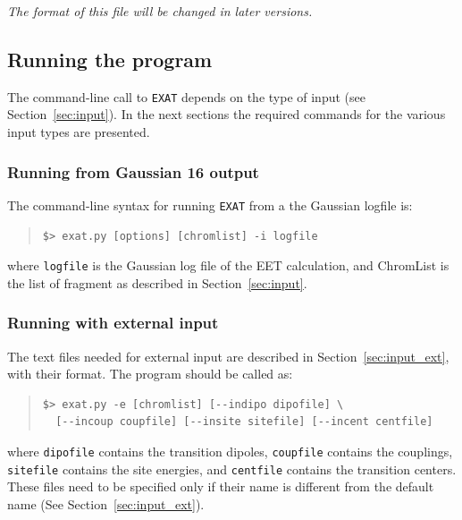 \documentclass[a4paper,11pt]{article}
\begin{document}
\emph{The format of this file will be changed in later versions.}

\subsection{Running the program}

The command-line call to \texttt{EXAT} depends on the type of input (see Section~\ref{sec:input}). In the next sections the required commands for the various input types are presented.

\subsubsection{Running from Gaussian 16 output}

The command-line syntax for running \texttt{EXAT} from a the Gaussian logfile is:

\begin{framed}
\begin{quote}
\begin{verbatim}
$> exat.py [options] [chromlist] -i logfile
\end{verbatim}
\end{quote}
\end{framed}

where \texttt{logfile} is the Gaussian log file of the EET calculation, and ChromList is the list of fragment as described in Section~\ref{sec:input}. 


\subsubsection{Running with external input}

The text files needed for external input are described in Section~\ref{sec:input_ext}, with their format. The program should be called as:

\begin{framed}
\begin{quote}
\begin{verbatim}
$> exat.py -e [chromlist] [--indipo dipofile] \
  [--incoup coupfile] [--insite sitefile] [--incent centfile]
\end{verbatim}
\end{quote}
\end{framed}

where \texttt{dipofile} contains the transition dipoles, \texttt{coupfile} contains the couplings, \texttt{sitefile} contains the site energies, and \texttt{centfile} contains the transition centers. These files need to be specified only if their name is different from the default name (See Section~\ref{sec:input_ext}).
\end{document}
